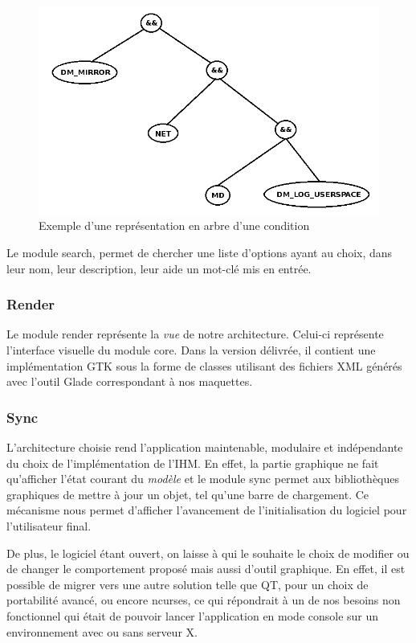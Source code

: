 \documentclass[16pts]{report}
\begin{document}
    \begin{figure}[H]
        \includegraphics[scale=0.5]{illustrations/condition_tree.png}
        \centering
        \caption{Exemple d'une représentation en arbre d'une condition}
        \label{fig:condTree}
    \end{figure}

    Le module search, permet de chercher une liste d'options ayant au choix,
    dans leur nom, leur description, leur aide un mot-clé mis en entrée.

    \subsubsection{Render}
    \label{sub:Render}
    Le module render représente la \textit{vue} de notre architecture.
    Celui-ci représente l'interface visuelle du module core.
    Dans la version délivrée, il contient une implémentation GTK sous la forme
    de classes utilisant des fichiers XML générés avec l'outil Glade
    correspondant à nos maquettes.

    \subsubsection{Sync}
    \label{sub:Sync}
    L'architecture choisie rend l'application maintenable, modulaire et
    indépendante du choix de l'implémentation de l'IHM. En effet, la partie
    graphique ne fait qu'afficher l'état courant du \textit{modèle} et
    le module sync permet aux bibliothèques graphiques de mettre à jour un
    objet, tel qu'une barre de chargement. Ce mécanisme nous permet d'afficher
    l'avancement de l'initialisation du logiciel pour l'utilisateur final.

    De plus, le logiciel étant ouvert, on laisse à qui le souhaite le choix de
    modifier ou de changer le comportement proposé mais aussi d'outil
    graphique. En effet, il est possible de migrer vers une autre solution
    telle que QT, pour un choix de portabilité avancé,  ou encore ncurses, ce
    qui répondrait à un de nos besoins non fonctionnel qui était de pouvoir
    lancer l'application en mode console sur un environnement avec ou sans
    serveur X.
\end{document}
